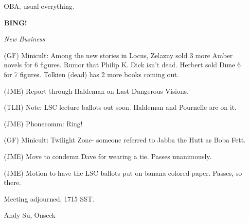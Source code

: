 \documentclass[12pt]{article}
\newcommand{\bing}{{\bf BING!} }
\newcommand{\goto}[1]{\bing \vskip 12pt \centerline{{\em{#1}}}}
\begin{document}
OBA, usual everything.

\goto{New Business}

(GF) Minicult: Among the new stories in Locus, Zelazny sold 3 more Amber novels for 6 figures. Rumor that Philip K. Dick isn't dead. Herbert sold Dune 6 for 7 figures. Tolkien (dead) has 2 more books coming out.

(JME) Report through Haldeman on Last Dangerous Visions.

(TLH) Note: LSC lecture ballots out soon. Haldeman and Pournelle are on it.

(JME) Phonecomm: Ring!

(GF) Minicult: Twilight Zone- someone referred to Jabba the Hutt as Boba Fett.

(JME) Move to condemn Dave for wearing a tie. Passes unanimously.

(JME) Motion to have the LSC ballots put on banana colored paper. Passes, so there.

\vspace{12pt}

\noindent
Meeting adjourned, 1715 SST.

\vspace{18pt}

\centerline{Andy Su, Onseck}
\end{document}
